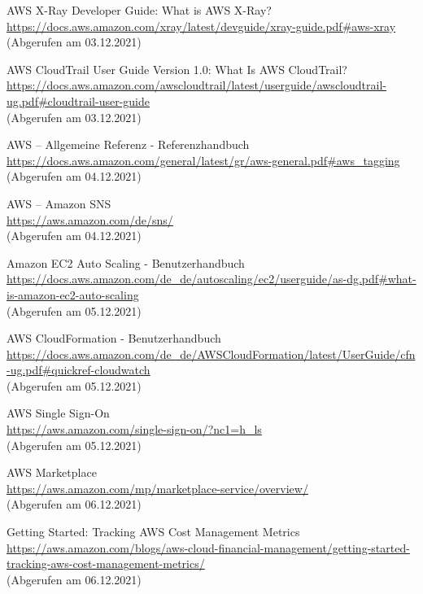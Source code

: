 \begin{thebibliography}{HR08}
  AWS X-Ray Developer Guide: What is AWS X-Ray? \\
  \url{https://docs.aws.amazon.com/xray/latest/devguide/xray-guide.pdf#aws-xray}\\
  (Abgerufen am 03.12.2021) 
  
 AWS CloudTrail User Guide Version 1.0: What Is AWS CloudTrail?\\
  \url{https://docs.aws.amazon.com/awscloudtrail/latest/userguide/awscloudtrail-ug.pdf#cloudtrail-user-guide}\\
  (Abgerufen am 03.12.2021)

 AWS – Allgemeine Referenz - Referenzhandbuch\\
  \url{https://docs.aws.amazon.com/general/latest/gr/aws-general.pdf#aws_tagging}\\
  (Abgerufen am 04.12.2021)
  
   AWS – Amazon SNS\\
  \url{https://aws.amazon.com/de/sns/}\\
  (Abgerufen am 04.12.2021)

   Amazon EC2 Auto Scaling - Benutzerhandbuch \\
  \url{https://docs.aws.amazon.com/de_de/autoscaling/ec2/userguide/as-dg.pdf#what-is-amazon-ec2-auto-scaling}\\
  (Abgerufen am 05.12.2021)

     AWS CloudFormation - Benutzerhandbuch\\
  \url{https://docs.aws.amazon.com/de_de/AWSCloudFormation/latest/UserGuide/cfn-ug.pdf#quickref-cloudwatch}\\
  (Abgerufen am 05.12.2021)
  
   AWS Single Sign-On\\
  \url{https://aws.amazon.com/single-sign-on/?nc1=h_ls}\\
  (Abgerufen am 05.12.2021)
   
   AWS Marketplace\\
  \url{https://aws.amazon.com/mp/marketplace-service/overview/}\\
  (Abgerufen am 06.12.2021)
  
 Getting Started: Tracking AWS Cost Management Metrics\\
  \url{https://aws.amazon.com/blogs/aws-cloud-financial-management/getting-started-tracking-aws-cost-management-metrics/}\\
  (Abgerufen am 06.12.2021)
  

\end{thebibliography}
